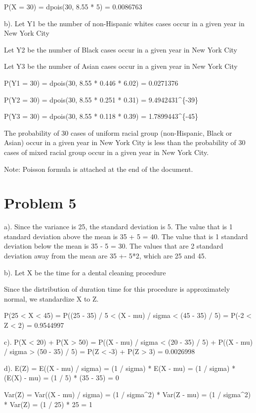 \documentclass[]{article}
\begin{document}
P(X = 30) = dpois(30, 8.55 * 5) = 0.0086763

b). Let Y1 be the number of non-Hispanic whites cases occur in a given
year in New York City

Let Y2 be the number of Black cases occur in a given year in New York
City

Let Y3 be the number of Asian cases occur in a given year in New York
City

P(Y1 = 30) = dpois(30, 8.55 * 0.446 * 6.02) = 0.0271376

P(Y2 = 30) = dpois(30, 8.55 * 0.251 * 0.31) =
9.4942431\^{}\{-39\}

P(Y3 = 30) = dpois(30, 8.55 * 0.118 * 0.39) =
1.7899443\^{}\{-45\}

The probability of 30 cases of uniform racial group (non-Hispanic, Black
or Asian) occur in a given year in New York City is less than the
probability of 30 cases of mixed racial group occur in a given year in
New York City.

Note: Poisson formula is attached at the end of the document.

\section{Problem 5}\label{problem-5}

a). Since the variance is 25, the standard deviation is 5. The value
that is 1 standard deviation above the mean is 35 + 5 = 40. The value
that is 1 standard deviation below the mean is 35 - 5 = 30. The values
that are 2 standard deviation away from the mean are 35 +- 5*2, which
are 25 and 45.

b). Let X be the time for a dental cleaning procedure

Since the distribution of duration time for this procedure is
approximately normal, we standardize X to Z.

P(25 \textless{} X \textless{} 45) = P((25 - 35) / 5 \textless{} (X -
mu) / sigma \textless{} (45 - 35) / 5) = P(-2 \textless{} Z \textless{}
2) = 0.9544997

c). P(X \textless{} 20) + P(X \textgreater{} 50) = P((X - mu) / sigma
\textless{} (20 - 35) / 5) + P((X - mu) / sigma \textgreater{} (50 - 35)
/ 5) = P(Z \textless{} -3) + P(Z \textgreater{} 3) = 0.0026998

d). E(Z) = E((X - mu) / sigma) = (1 / sigma) * E(X - mu) = (1 / sigma) *
(E(X) - mu) = (1 / 5) * (35 - 35) = 0

Var(Z) = Var((X - mu) / sigma) = (1 / sigma\^{}2) * Var(Z - mu) = (1 /
sigma\^{}2) * Var(Z) = (1 / 25) * 25 = 1
\end{document}
